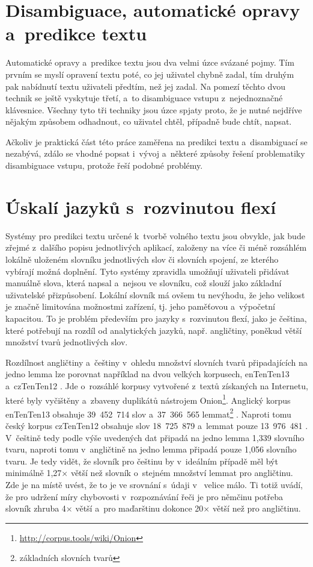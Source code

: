 \documentclass[a4paper,11pt,openany]{book} %
\begin{document}
\section{Disambiguace, automatické opravy a~predikce textu}

Automatické opravy a~predikce textu jsou dva velmi úzce svázané pojmy. Tím prvním se myslí opravení textu poté, co jej uživatel chybně zadal, tím druhým pak nabídnutí textu uživateli předtím, než jej zadal. Na pomezí těchto dvou technik se ještě vyskytuje třetí, a~to disambiguace vstupu z~nejednoznačné klávesnice. Všechny tyto tři techniky jsou úzce spjaty proto, že je nutné nejdříve nějakým způsobem odhadnout, co uživatel chtěl, případně bude chtít, napsat.

Ačkoliv je praktická část této práce zaměřena na predikci textu a~disambiguací se nezabývá, zdálo se vhodné popsat i~vývoj a~některé způsoby řešení problematiky disambiguace vstupu, protože řeší podobné problémy.

\section{Úskalí jazyků s~rozvinutou flexí}

Systémy pro predikci textu určené k~tvorbě volného textu jsou obvykle, jak bude zřejmé z~dalšího popisu jednotlivých aplikací, založeny na více či méně rozsáhlém lokálně uloženém slovníku jednotlivých slov či slovních spojení, ze kterého vybírají možná doplnění. Tyto systémy zpravidla umožňují uživateli přidávat manuálně slova, která napsal a~nejsou ve slovníku, což slouží jako základní uživatelské přizpůsobení. Lokální slovník má ovšem tu nevýhodu, že jeho velikost je značně limitována možnostmi zařízení, tj. jeho paměťovou a~výpočetní kapacitou. To je problém především pro jazyky s~rozvinutou flexí, jako je čeština, které potřebují na rozdíl od analytických jazyků, např. angličtiny, poněkud větší množství tvarů jednotlivých slov. 

Rozdílnost angličtiny a~češtiny v~ohledu množství slovních tvarů připadajících na jedno lemma lze porovnat například na dvou velkých korpusech, enTenTen13 a~czTenTen12 \parencite{suchomel2012}. Jde o~rozsáhlé korpusy vytvořené z~textů získaných na Internetu, které byly vyčištěny a~zbaveny duplikátů nástrojem Onion\footnote{\url{http://corpus.tools/wiki/Onion}}. Anglický korpus enTenTen13 obsahuje 39~452~714 slov a~37~366~565 lemmat\footnote{základních slovních tvarů} \parencite{czTenTen12_info}. Naproti tomu český korpus czTenTen12 obsahuje slov 18~725~879 a~lemmat pouze 13~976~481 \parencite{enTenTen13_info}. V~češtině tedy podle výše uvedených dat připadá na jedno lemma 1,339 slovního tvaru, naproti tomu v~angličtině na jedno lemma připadá pouze 1,056 slovního tvaru. Je tedy vidět, že slovník pro češtinu by v~ideálním případě měl být minimálně 1,27× větší než slovník o~stejném množství lemmat pro angličtinu. Zde je na místě uvést, že to je ve srovnání s~údaji v~\parencite{nemeth2012word} velice málo. Ti totiž uvádí, že pro udržení míry chybovosti v~rozpoznávání řeči je pro němčinu potřeba slovník zhruba 4× větší a~pro maďarštinu dokonce 20× větší než pro angličtinu.
\end{document}
